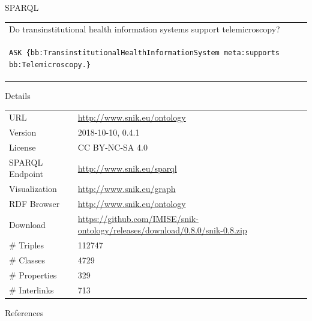 \documentclass[portrait,final,a0paper,fontscale=0.310]{baposter}
\begin{document}
\begin{poster}
\begin{posterbox}[name=sparql,column=1,below=background]{SPARQL}
{\begin{tabular*}{\columnwidth}{l}
Do transinstitutional health information systems support telemicroscopy?\\
\begin{lstlisting}
ASK {bb:TransinstitutionalHealthInformationSystem meta:supports bb:Telemicroscopy.}
\end{lstlisting}
\end{tabular*}
}
\vspace{0.0em}
\end{posterbox}
\begin{posterbox}[name=source,column=1,below=snikgraph]{Details}
\begin{tabulary}{\columnwidth}{lL}
\toprule
URL		&\url{http://www.snik.eu/ontology}\\
Version		&2018-10-10, 0.4.1\\
License		&CC BY-NC-SA 4.0\\
SPARQL Endpoint	&\url{http://www.snik.eu/sparql}\\
Visualization	&\url{http://www.snik.eu/graph}\\
RDF Browser	&\url{http://www.snik.eu/ontology}\\
Download	&\url{https://github.com/IMISE/snik-ontology/releases/download/0.8.0/snik-0.8.zip}\\
\# Triples	&\num{112747}\\
\# Classes	&\num{4729}\\
\# Properties	&\num{329}\\
\# Interlinks	&\num{713}\\
\bottomrule
\end{tabulary}%
\end{posterbox}
\begin{posterbox}[name=references,column=1,below=sparql]{References}
    
    \begingroup
    \renewcommand{\section}[2]{}%

\end{posterbox}
\end{poster}
\end{document}
